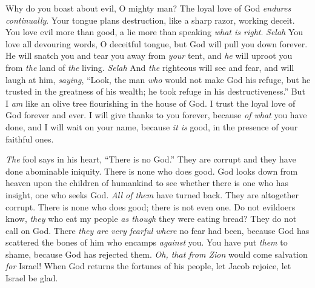 \begin{biblechapter} %
 Why do you boast about evil, O mighty man? 
The loyal love of God \textit{endures} \textit{continually}.
\verse Your tongue plans destruction, 
like a sharp razor, working deceit.
\verse You love evil more than good, 
a lie more than speaking \textit{what is right}. \textit{Selah}
\verse You love all devouring words, 
O deceitful tongue,
\verse but God will pull you down forever. 
He will snatch you and tear you away from \textit{your} tent, 
and \textit{he} will uproot you from \textit{the} land of \textit{the} living. \textit{Selah}
\verse And \textit{the} righteous will see and fear, 
and will laugh at him, \textit{saying},
\verse “Look, the man \textit{who} would not make God his refuge, 
but he trusted in the greatness of his wealth; 
he took refuge in his destructiveness.”
\verse But I \textit{am} like an olive tree flourishing 
in the house of God. 
I trust the loyal love of God forever and ever.
\verse I will give thanks to you forever, because \textit{of what} you have done, 
and I will wait on your name, because \textit{it is} good, 
in the presence of your faithful ones.
\end{biblechapter}

\begin{biblechapter} %
 \textit{The} fool says in his heart, “There is no God.” 
They are corrupt and they have done abominable iniquity. 
There is none who does good.
\verse God looks down from heaven upon the children of humankind 
to see whether there is one who has insight, 
one who seeks God.
\verse \textit{All of them} have turned back. 
They are altogether corrupt. 
There is none who does good; 
there is not even one.
\verse Do not evildoers know, 
\textit{they} who eat my people \textit{as though} they were eating bread? 
They do not call on God.
\verse There \textit{they are very fearful} 
\textit{where} no fear had been, 
because God has scattered the bones of him who encamps \textit{against} you. 
You have put \textit{them} to shame, because God has rejected them.
\verse \textit{Oh, that from Zion} would come salvation \textit{for} Israel! 
When God returns the fortunes of his people, 
let Jacob rejoice, let Israel be glad.
\end{biblechapter}

